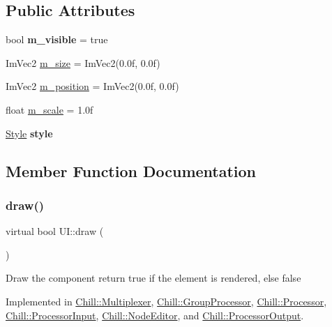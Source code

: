 \subsection*{Public Attributes}
\begin{DoxyCompactItemize}
\item 
\mbox{\label{class_u_i_a168bfc22672b23e25e18c0efcbcbe21a}} 
bool {\bfseries m\+\_\+visible} = true
\item 
Im\+Vec2 \mbox{\hyperlink{class_u_i_a15b42e4e8dfa93817e613ea089d0dfec}{m\+\_\+size}} = Im\+Vec2(0.\+0f, 0.\+0f)
\item 
Im\+Vec2 \mbox{\hyperlink{class_u_i_ad2489ec467f98fb8efa04e1724ff8bc8}{m\+\_\+position}} = Im\+Vec2(0.\+0f, 0.\+0f)
\item 
float \mbox{\hyperlink{class_u_i_a9a7264d8fcbead94498e2723204f0b63}{m\+\_\+scale}} = 1.\+0f
\item 
\mbox{\label{class_u_i_acaab3c70fde81efa27ef2d7aa41a8f63}} 
\mbox{\hyperlink{struct_style}{Style}} {\bfseries style}
\end{DoxyCompactItemize}


\subsection{Member Function Documentation}
\mbox{\label{class_u_i_a5025b88e26f21852c0cd2e4b42675c50}} 
\subsubsection{\texorpdfstring{draw()}{draw()}}
{\footnotesize\ttfamily virtual bool U\+I\+::draw (\begin{DoxyParamCaption}{ }\end{DoxyParamCaption})\hspace{0.3cm}{\ttfamily [pure virtual]}}

Draw the component return true if the element is rendered, else false 

Implemented in \mbox{\hyperlink{class_chill_1_1_multiplexer_aac8cf52a617091ffedaee970b5550270}{Chill\+::\+Multiplexer}}, \mbox{\hyperlink{class_chill_1_1_group_processor_a6c3eadfcb171c48a2d76bebefd153fcb}{Chill\+::\+Group\+Processor}}, \mbox{\hyperlink{class_chill_1_1_processor_a2eb86d9750e1c0d5ac7f6da166aca8fd}{Chill\+::\+Processor}}, \mbox{\hyperlink{class_chill_1_1_processor_input_a0dfb7b669e95248d3a5974b7800aeb66}{Chill\+::\+Processor\+Input}}, \mbox{\hyperlink{class_chill_1_1_node_editor_a7b67d5473c93d3258a2dc565e76da024}{Chill\+::\+Node\+Editor}}, and \mbox{\hyperlink{class_chill_1_1_processor_output_ae9d397902ac6fcd1fa09fff1cc9231c0}{Chill\+::\+Processor\+Output}}.

